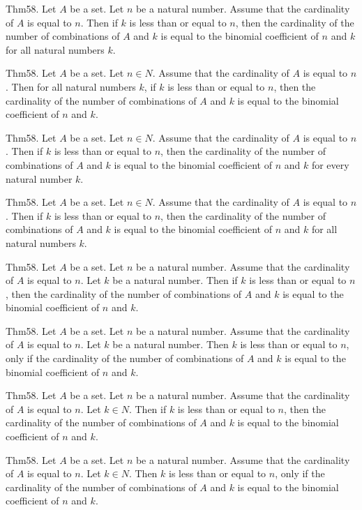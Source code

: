 \documentclass{article}
\begin{document}
Thm58. Let $A$ be a set. Let $n$ be a natural number. Assume that the cardinality of $A$ is equal to $n$. Then if $k$ is less than or equal to $n$, then the cardinality of the number of combinations of $A$ and $k$ is equal to the binomial coefficient of $n$ and $k$ for all natural numbers $k$.

Thm58. Let $A$ be a set. Let $n \in N$. Assume that the cardinality of $A$ is equal to $n$. Then for all natural numbers $k$, if $k$ is less than or equal to $n$, then the cardinality of the number of combinations of $A$ and $k$ is equal to the binomial coefficient of $n$ and $k$.

Thm58. Let $A$ be a set. Let $n \in N$. Assume that the cardinality of $A$ is equal to $n$. Then if $k$ is less than or equal to $n$, then the cardinality of the number of combinations of $A$ and $k$ is equal to the binomial coefficient of $n$ and $k$ for every natural number $k$.

Thm58. Let $A$ be a set. Let $n \in N$. Assume that the cardinality of $A$ is equal to $n$. Then if $k$ is less than or equal to $n$, then the cardinality of the number of combinations of $A$ and $k$ is equal to the binomial coefficient of $n$ and $k$ for all natural numbers $k$.

Thm58. Let $A$ be a set. Let $n$ be a natural number. Assume that the cardinality of $A$ is equal to $n$. Let $k$ be a natural number. Then if $k$ is less than or equal to $n$, then the cardinality of the number of combinations of $A$ and $k$ is equal to the binomial coefficient of $n$ and $k$.

Thm58. Let $A$ be a set. Let $n$ be a natural number. Assume that the cardinality of $A$ is equal to $n$. Let $k$ be a natural number. Then $k$ is less than or equal to $n$, only if the cardinality of the number of combinations of $A$ and $k$ is equal to the binomial coefficient of $n$ and $k$.

Thm58. Let $A$ be a set. Let $n$ be a natural number. Assume that the cardinality of $A$ is equal to $n$. Let $k \in N$. Then if $k$ is less than or equal to $n$, then the cardinality of the number of combinations of $A$ and $k$ is equal to the binomial coefficient of $n$ and $k$.

Thm58. Let $A$ be a set. Let $n$ be a natural number. Assume that the cardinality of $A$ is equal to $n$. Let $k \in N$. Then $k$ is less than or equal to $n$, only if the cardinality of the number of combinations of $A$ and $k$ is equal to the binomial coefficient of $n$ and $k$.
\end{document}
